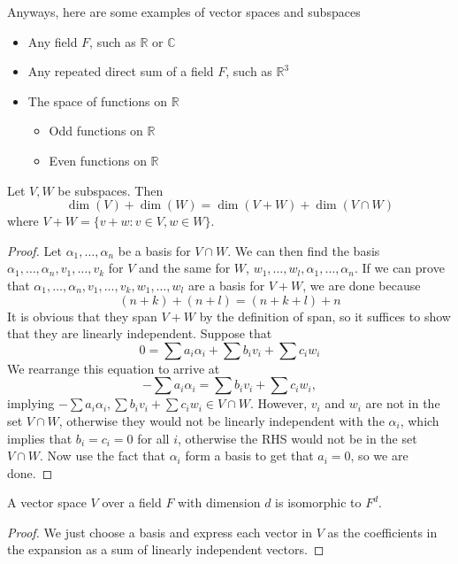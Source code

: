 Anyways, here are some examples of vector spaces and subspaces
\begin{itemize}
\item Any field $F$, such as $\mathbb{R}$ or $\mathbb{C}$
\item Any repeated direct sum of a field $F$, such as $\mathbb{R}^3$
\item The space of functions on $\mathbb{R}$
\begin{itemize}
\item Odd functions on $\mathbb{R}$
\item Even functions on $\mathbb{R}$
\end{itemize}
\end{itemize}

\begin{prop}
Let $V, W$ be subspaces. Then
\[ \dim(V) + \dim(W) = \dim(V + W) + \dim(V \cap W) \]
where $V + W = \lbrace v + w : v \in V, w \in W \rbrace$.
\end{prop}

\begin{proof}
Let $\alpha_1, \dots, \alpha_n$ be a basis for $V \cap W$. We can then
find the basis $\alpha_1, \dots, \alpha_n, v_1, \dots, v_k$ for $V$ and
the same for $W$, $w_1, \dots, w_l, \alpha_1, \dots, \alpha_n$. If we
can prove that $\alpha_1, \dots, \alpha_n, v_1, \dots, v_k, w_1, \dots,
w_l$ are a basis for $V + W$, we are done because
\[ (n + k) + (n + l) = (n + k + l) + n \]
It is obvious that they span $V + W$ by the definition of span, so it
suffices to show that they are linearly independent. Suppose that
\[ 0 = \sum a_i \alpha_i + \sum b_i v_i + \sum c_i w_i \]
We rearrange this equation to arrive at
\[ -\sum a_i \alpha_i = \sum b_i v_i + \sum c_i w_i, \]
implying $-\sum a_i \alpha_i, \sum b_i v_i + \sum c_i w_i \in V \cap W$.
However, $v_i$ and $w_i$ are not in the set $V \cap W$, otherwise they
would not be linearly independent with the $\alpha_i$, which implies
that $b_i = c_i = 0$ for all $i$, otherwise the RHS would not be in the
set $V \cap W$. Now use the fact that $\alpha_i$ form a basis to get
that $a_i = 0$, so we are done.
\end{proof}

\begin{prop}
A vector space $V$ over a field $F$ with dimension $d$ is isomorphic to
$F^d$.
\end{prop}

\begin{proof}
We just choose a basis and express each vector in $V$ as the
coefficients in the expansion as a sum of linearly independent vectors.
\end{proof}

